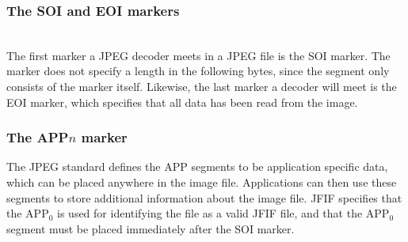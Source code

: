 \begin{infobox}
\subsubsection{The SOI and EOI markers}
\begin{centering}
\hspace{1.2cm} 
\end{centering}\\
The first marker a JPEG decoder meets in a JPEG file is the SOI marker. 
The marker does not specify a length in the following bytes, since the segment only consists of the marker itself.
Likewise, the last marker a decoder will meet is the EOI marker, which specifies that all data has been read from the image.

\subsubsection{The APP$n$ marker}
\begin{centering}
\end{centering}
The JPEG standard defines the APP segments to be application specific data, which can be placed anywhere in the image file. Applications can then use these segments to store additional information about the image file. JFIF specifies that the APP$_0$ is used for identifying the file as a valid JFIF file, and that the APP$_0$ segment must be placed immediately after the SOI marker.


\end{infobox}
